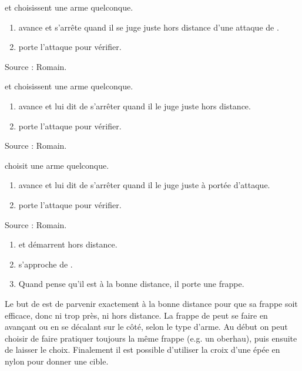 \begin{exercice}
\A et \D choisissent une arme quelconque.

\begin{enumerate}
	\item \A avance et s'arrête quand il se juge juste hors distance d'une attaque de \D.
	
	\item \D porte l'attaque pour vérifier.
\end{enumerate}

Source : Romain.

\end{exercice}


\begin{exercice}
\A et \D choisissent une arme quelconque.

\begin{enumerate}
	\item \A avance et \D lui dit de s'arrêter quand il le juge juste hors distance.
	
	\item \A porte l'attaque pour vérifier.
\end{enumerate}

Source : Romain.

\end{exercice}


\begin{exercice}
\A choisit une arme quelconque.

\begin{enumerate}
	\item \D avance et \A lui dit de s'arrêter quand il le juge juste à portée d'attaque.
	
	\item \A porte l'attaque pour vérifier.
\end{enumerate}

Source : Romain.

\end{exercice}


\begin{exercice}
\label{ex:frappe-dist:approche-frappe}

\begin{enumerate}
	\item \A et \D démarrent hors distance.
	\item \D s'approche de \A.
	\item Quand \A pense qu'il est à la bonne distance, il porte une frappe.
\end{enumerate}

Le but de \A est de parvenir exactement à la bonne distance pour que sa frappe soit efficace, donc ni trop près, ni hors distance.
La frappe de \A peut se faire en avançant ou en se décalant sur le côté, selon le type d'arme.
Au début on peut choisir de faire pratiquer toujours la même frappe (e.g.
un oberhau), puis ensuite de laisser le choix.
Finalement il est possible d'utiliser la croix d'une épée en nylon pour donner une cible.

\end{exercice}


